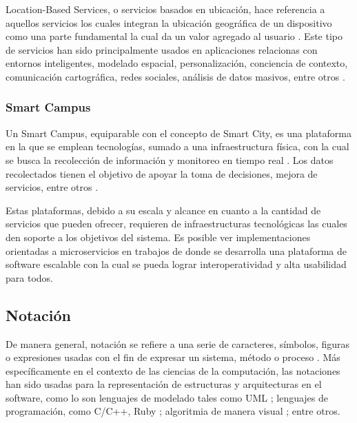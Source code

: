 Location-Based Services, o servicios basados en ubicación, hace referencia a aquellos servicios los cuales integran la ubicación geográfica de un dispositivo como una parte fundamental la cual da un valor agregado al usuario \cite{Schiller2004}. Este tipo de servicios han sido principalmente usados en aplicaciones relacionas con entornos inteligentes, modelado espacial, personalización, conciencia de contexto, comunicación cartográfica, redes sociales, análisis de datos masivos, entre otros \cite{Gartner2015,alliedmarketresearch2023}.

\subsubsection{Smart Campus}


Un Smart Campus, equiparable con el concepto de Smart City, es una plataforma en la que se emplean tecnologías, sumado a una infraestructura física, con la cual se busca la recolección de información y monitoreo en tiempo real \cite{MinAllah2020}. Los datos recolectados tienen el objetivo de apoyar la toma de decisiones, mejora de servicios, entre otros \cite{Anagnostopoulos_2023}.

Estas plataformas, debido a su escala y alcance en cuanto a la cantidad de servicios que pueden ofrecer, requieren de 
infraestructuras tecnológicas las cuales den soporte a los objetivos del sistema. Es posible ver implementaciones orientadas a microservicios en trabajos de \citeauthor{henry_2020} \citeyear{henry_2020} donde se desarrolla una plataforma de software escalable con la cual se pueda lograr interoperatividad y alta usabilidad para todos.


\subsection{Notación}

De manera general, notación se refiere a una serie de caracteres, símbolos, figuras o expresiones usadas con el fin de expresar un sistema, método o proceso \cite{MerriamWebsterNotation}. Más específicamente en el contexto de las ciencias de la computación, las notaciones han sido usadas para la representación de estructuras y arquitecturas en el software, como lo son lenguajes de modelado tales como UML \cite{WhatIsUML}; lenguajes de programación, como C/C++, Ruby \cite{Bansal2013}; algoritmia de manera visual \cite{RutanenKalle2018McoO}; entre otros.

